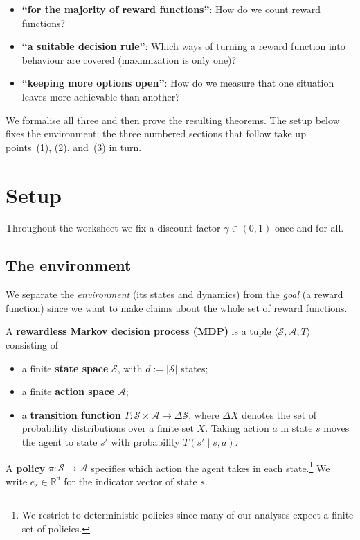 \documentclass[11pt]{article}
\newcommand{\cS}{\mathcal{S}}
\newcommand{\cA}{\mathcal{A}}
\newcommand{\R}{\mathbb{R}}
\begin{document}
\begin{itemize}\itemsep=3pt
  \item[\textbf{(1)}] \textbf{``for the majority of reward functions''}: How do we count reward functions?
  \item[\textbf{(2)}] \textbf{``a suitable decision rule''}: Which ways of turning a
  reward function into behaviour are covered (maximization is only one)?
  \item[\textbf{(3)}] \textbf{``keeping more options open''}: How do we measure that one situation leaves more achievable than
  another?
\end{itemize}

We formalise all three and then prove the resulting theorems. The setup below fixes the
environment; the three numbered sections that follow take up points~(1), (2), and~(3) in turn.



\section*{Setup}

Throughout the worksheet we fix a discount factor $\gamma \in (0,1)$ once and for all.

\subsection*{The environment}

We separate the \emph{environment} (its states and dynamics) from the \emph{goal} (a
reward function) since we want to make claims about the whole set of reward functions.

\begin{definition}\label{def:mdp}
A \textbf{rewardless Markov decision process (MDP)} is a tuple
$\langle \cS, \cA, T\rangle$ consisting of
\begin{itemize}\itemsep=2pt
  \item a finite \textbf{state space} $\cS$, with $d := |\cS|$ states;
  \item a finite \textbf{action space} $\cA$;
  \item a \textbf{transition function} $T : \cS \times \cA \to \Delta\cS$, where
  $\Delta X$ denotes the set of probability distributions over a finite set $X$. Taking
  action $a$ in state $s$ moves the agent to state $s'$ with probability
  $T(s' \mid s, a)$.
\end{itemize}
A \textbf{policy} $\pi : \cS \to \cA$ specifies which action the agent takes in each
state.\footnote{We restrict to deterministic policies since many of our analyses expect a finite set of policies.} We write
$e_s \in \R^{d}$ for the indicator vector of state $s$.
\end{definition}
\end{document}
